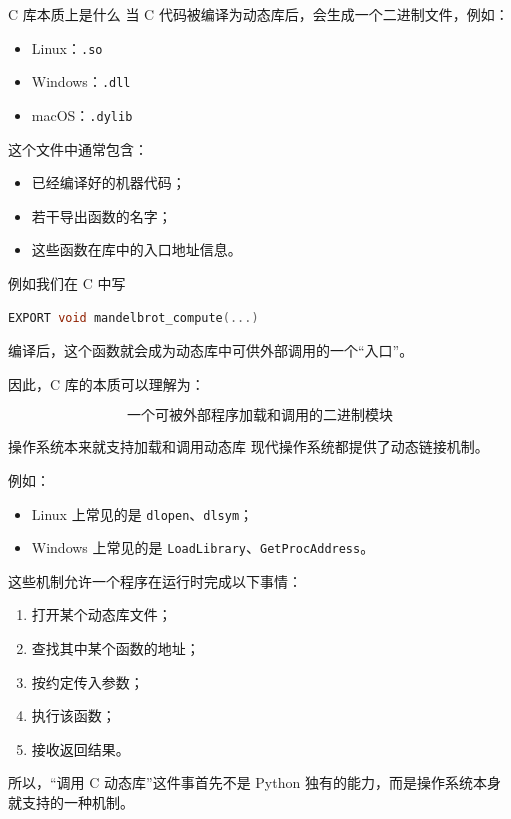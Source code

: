 \documentclass[aspectratio=169,11pt]{ctexbeamer}
\begin{document}
\begin{frame}[fragile]{ C 库本质上是什么}
当 C 代码被编译为动态库后，会生成一个二进制文件，例如：

\begin{itemize}
  \item Linux：\texttt{.so}
  \item Windows：\texttt{.dll}
  \item macOS：\texttt{.dylib}
\end{itemize}

这个文件中通常包含：

\begin{itemize}
  \item 已经编译好的机器代码；
  \item 若干导出函数的名字；
  \item 这些函数在库中的入口地址信息。
\end{itemize}

例如我们在 C 中写
\begin{lstlisting}[language=C]
EXPORT void mandelbrot_compute(...)
\end{lstlisting}
编译后，这个函数就会成为动态库中可供外部调用的一个“入口”。

因此，C 库的本质可以理解为：

\[
\boxed{\text{一个可被外部程序加载和调用的二进制模块}}
\]
\end{frame}

\begin{frame}[fragile]{操作系统本来就支持加载和调用动态库}
现代操作系统都提供了动态链接机制。

例如：

\begin{itemize}
  \item Linux 上常见的是 \texttt{dlopen}、\texttt{dlsym}；
  \item Windows 上常见的是 \texttt{LoadLibrary}、\texttt{GetProcAddress}。
\end{itemize}

\vspace{0.5em}
这些机制允许一个程序在运行时完成以下事情：

\begin{enumerate}
  \item 打开某个动态库文件；
  \item 查找其中某个函数的地址；
  \item 按约定传入参数；
  \item 执行该函数；
  \item 接收返回结果。
\end{enumerate}

\vspace{0.5em}
所以，“调用 C 动态库”这件事首先不是 Python 独有的能力，而是操作系统本身就支持的一种机制。
\end{frame}
\end{document}
